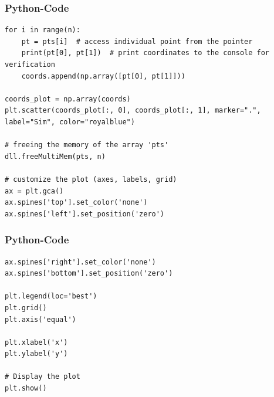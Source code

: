 \documentclass{beamer}
\begin{document}
\begin{frame}[fragile]
\frametitle{Python-Code}
\begin{lstlisting}
for i in range(n):
    pt = pts[i]  # access individual point from the pointer
    print(pt[0], pt[1])  # print coordinates to the console for verification
    coords.append(np.array([pt[0], pt[1]]))

coords_plot = np.array(coords)
plt.scatter(coords_plot[:, 0], coords_plot[:, 1], marker=".", label="Sim", color="royalblue")

# freeing the memory of the array 'pts'
dll.freeMultiMem(pts, n)

# customize the plot (axes, labels, grid)
ax = plt.gca()
ax.spines['top'].set_color('none')
ax.spines['left'].set_position('zero')

\end{lstlisting}
\end{frame}
\begin{frame}[fragile]
\frametitle{Python-Code}
\begin{lstlisting}
ax.spines['right'].set_color('none')
ax.spines['bottom'].set_position('zero')

plt.legend(loc='best')
plt.grid()
plt.axis('equal')

plt.xlabel('x')
plt.ylabel('y')

# Display the plot
plt.show()
\end{lstlisting}
\end{frame}
\end{document}
